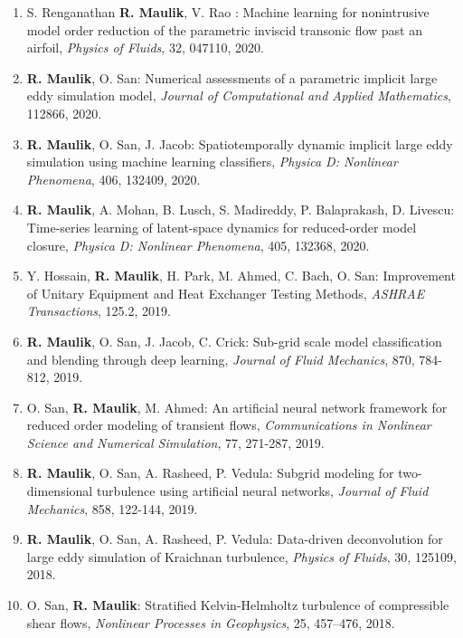 \documentclass[letterpaper]{article}
\begin{document}
\begin{enumerate}
\item S. Renganathan \textbf{R. Maulik}, V. Rao : Machine learning for nonintrusive model order reduction of the parametric inviscid transonic flow past an airfoil, {\it Physics of Fluids}, 32, 047110, 2020. 

\item \textbf{R. Maulik}, O. San: Numerical assessments of a parametric implicit large eddy simulation model, {\it Journal of Computational and Applied Mathematics}, 112866, 2020.

\item \textbf{R. Maulik}, O. San, J. Jacob: Spatiotemporally dynamic implicit large eddy simulation using machine learning classifiers, {\it Physica D: Nonlinear Phenomena}, 406, 132409, 2020. 

\item \textbf{R. Maulik}, A. Mohan, B. Lusch, S. Madireddy, P. Balaprakash, D. Livescu: Time-series learning of latent-space dynamics for reduced-order model closure, {\it Physica D: Nonlinear Phenomena}, 405, 132368, 2020. 

\item Y. Hossain, \textbf{R. Maulik}, H. Park, M. Ahmed, C. Bach, O. San: Improvement of Unitary Equipment and Heat Exchanger Testing Methods, {\it ASHRAE Transactions}, 125.2, 2019. 

\item \textbf{R. Maulik}, O. San, J. Jacob, C. Crick: Sub-grid scale model classification and blending through deep learning, {\it Journal of Fluid Mechanics}, 870, 784-812, 2019. 

\item O. San, \textbf{R. Maulik}, M. Ahmed: An artificial neural network framework for reduced order modeling of transient flows, {\it Communications in Nonlinear Science and Numerical Simulation}, 77, 271-287, 2019. 

\item \textbf{R. Maulik}, O. San, A. Rasheed, P. Vedula: Subgrid modeling for two-dimensional turbulence using artificial neural networks, {\it Journal of Fluid Mechanics}, 858, 122-144, 2019. 

\item \textbf{R. Maulik}, O. San, A. Rasheed, P. Vedula: Data-driven deconvolution for large eddy simulation of Kraichnan turbulence, {\it Physics of Fluids}, 30, 125109, 2018. 

\item O. San, \textbf{R. Maulik}: Stratified Kelvin-Helmholtz turbulence of compressible shear flows, {\it Nonlinear Processes in Geophysics}, 25, 457--476, 2018.


\end{enumerate}
\end{document}
